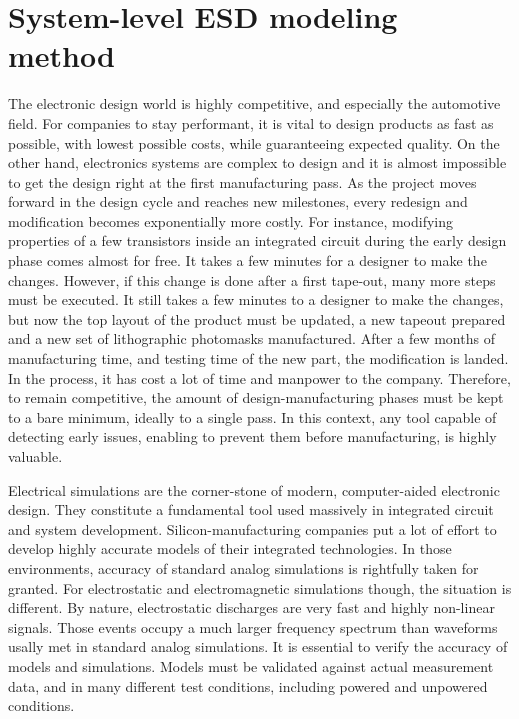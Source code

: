 \section{System-level ESD modeling method}
\label{sec:esd-modeling}

The electronic design world is highly competitive, and especially the automotive field.
For companies to stay performant, it is vital to design products as fast as possible, with lowest possible costs, while guaranteeing expected quality.
On the other hand, electronics systems are complex to design and it is almost impossible to get the design right at the first manufacturing pass.
As the project moves forward in the design cycle and reaches new milestones, every redesign and modification becomes exponentially more costly.
For instance, modifying properties of a few transistors inside an integrated circuit during the early design phase comes almost for free.
It takes a few minutes for a designer to make the changes.
However, if this change is done after a first tape-out, many more steps must be executed.
It still takes a few minutes to a designer to make the changes, but now the top layout of the product must be updated, a new tapeout prepared and a new set of lithographic photomasks manufactured.
After a few months of manufacturing time, and testing time of the new part, the modification is landed.
In the process, it has cost a lot of time and manpower to the company.
Therefore, to remain competitive, the amount of design-manufacturing phases must be kept to a bare minimum, ideally to a single pass.
In this context, any tool capable of detecting early issues, enabling to prevent them before manufacturing, is highly valuable.

Electrical simulations are the corner-stone of modern, computer-aided electronic design.
They constitute a fundamental tool used massively in integrated circuit and system development.
Silicon-manufacturing companies put a lot of effort to develop highly accurate models of their integrated technologies.
In those environments, accuracy of standard analog simulations is rightfully taken for granted.
For electrostatic and electromagnetic simulations though, the situation is different.
By nature, electrostatic discharges are very fast and highly non-linear signals.
Those events occupy a much larger frequency spectrum than waveforms usally met in standard analog simulations.
It is essential to verify the accuracy of models and simulations.
Models must be validated against actual measurement data, and in many different test conditions, including powered and unpowered conditions.

